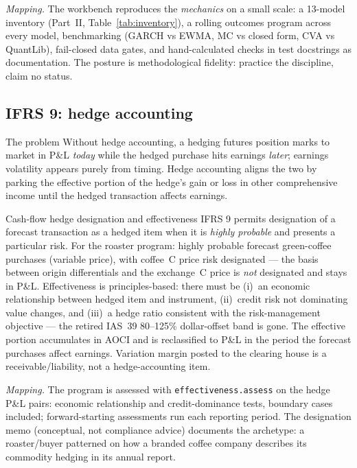 \documentclass[11pt,a4paper]{article}
\begin{document}
\emph{Mapping.} The workbench reproduces the \emph{mechanics} on a small
scale: a 13-model inventory (Part~II, Table~\ref{tab:inventory}), a
rolling outcomes program across every model, benchmarking (GARCH vs
EWMA, MC vs closed form, CVA vs QuantLib), fail-closed data gates, and
hand-calculated checks in test docstrings as documentation. The posture
is methodological fidelity: practice the discipline, claim no status.

\subsection{IFRS 9: hedge accounting}

\begin{concept}{The problem}
Without hedge accounting, a hedging futures position marks to market in
P\&L \emph{today} while the hedged purchase hits earnings \emph{later};
earnings volatility appears purely from timing. Hedge accounting aligns
the two by parking the effective portion of the hedge's gain or loss in
other comprehensive income until the hedged transaction affects
earnings.
\end{concept}

\begin{concept}{Cash-flow hedge designation and effectiveness}
IFRS 9 \cite{ifrs9} permits designation of a forecast transaction as a
hedged item when it is \emph{highly probable} and presents a particular
risk. For the roaster program: highly probable forecast green-coffee
purchases (variable price), with coffee~C price risk designated --- the
basis between origin differentials and the exchange~C price is
\emph{not} designated and stays in P\&L. Effectiveness is principles-based:
there must be (i)~an economic relationship between hedged item and
instrument, (ii)~credit risk not dominating value changes, and
(iii)~a hedge ratio consistent with the risk-management objective ---
the retired IAS~39 80--125\% dollar-offset band is gone. The effective
portion accumulates in AOCI and is reclassified to P\&L in the period
the forecast purchases affect earnings. Variation margin posted to the
clearing house is a receivable/liability, not a hedge-accounting item.
\end{concept}

\emph{Mapping.} The program is assessed with
\texttt{effectiveness.assess} on the hedge P\&L pairs: economic
relationship and credit-dominance tests, boundary cases included;
forward-starting assessments run each reporting period. The designation
memo (conceptual, not compliance advice) documents the archetype: a
roaster/buyer patterned on how a branded coffee company describes its
commodity hedging in its annual report.
\end{document}
